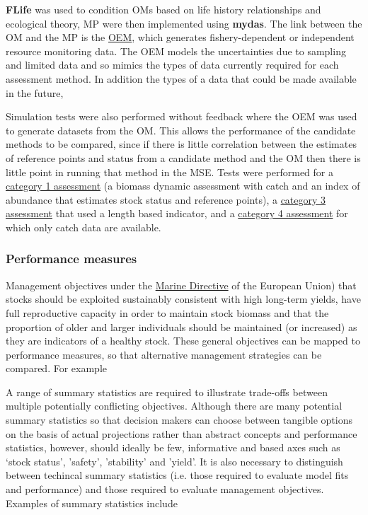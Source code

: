 \textbf{FLife} was used to  condition OMs based on life history relationships and ecological theory, MP were then implemented using \textbf{mydas}. The link between the OM and the MP is the \href{https://3o2y9wugzp1kfxr5hvzgzq-on.drv.tw/MyDas/vignettes/oem.html}{OEM}, which generates fishery-dependent or independent resource monitoring data. The OEM models the uncertainties due to sampling and limited data and so mimics the types of data currently required for each assessment method. In addition the types of a data that could be made available in the future,

Simulation tests were also performed without feedback where the OEM was used to generate datasets from the OM. This allows the performance of the candidate methods to be compared, since if there is little correlation between the estimates of reference points and status from a candidate method and the OM then there is little point in running that method in the MSE. Tests were performed for a 
\href{https://3o2y9wugzp1kfxr5hvzgzq-on.drv.tw/MyDas/tasks/4/R/simtest-bd.pdf}{category 1 assessment} (a biomass dynamic assessment with catch and an index of abundance that estimates stock status and reference points), a \href{https://3o2y9wugzp1kfxr5hvzgzq-on.drv.tw/MyDas/tasks/4/R/simtest-lbspr.pdf}{category 3 assessment} that used a length based indicator, and a \href{https://3o2y9wugzp1kfxr5hvzgzq-on.drv.tw/MyDas/tasks/4/R/simtest-bdsra.pdf}{category 4 assessment} for which only catch data are available.

\subsubsection*{Performance measures} 

Management objectives under the \href{http://ec.europa.eu/environment/marine/good-environmental-status/descriptor-3/index_en.htm}{Marine Directive} of the European Union) that stocks should be exploited sustainably consistent with high long-term yields, have full reproductive capacity in order to maintain stock biomass and that the proportion of older and larger individuals should be maintained (or increased) as they are indicators of a healthy stock. These general objectives can be mapped to performance measures, so that alternative management strategies can be compared. For example

A range of summary statistics are required to illustrate trade-offs between multiple potentially conflicting objectives. Although there are many potential summary statistics so that decision makers can choose between tangible options on the basis of actual projections rather than abstract concepts and performance statistics, however, should ideally be few, informative and based axes such as ‘stock status’, 'safety', 'stability' and 'yield'. It is also necessary to distinguish between techincal summary statistics (i.e. those required to evaluate model fits and performance) and those required to evaluate management objectives. Examples of summary statistics include 


